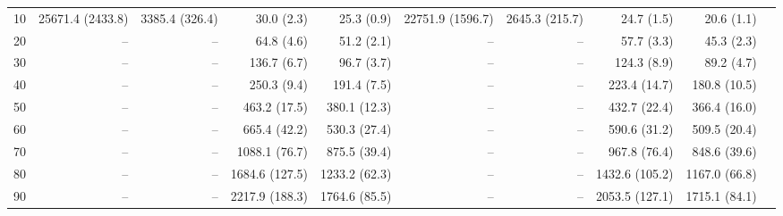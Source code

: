 \documentclass[utf8]{frontiersSCNS} %
\begin{document}
\begin{table*}[htp]
{\begin{tabular}{|r|r|r|r|r|r|r|r|r|r|}
    10 & 25671.4 (2433.8) & 3385.4 (326.4) & 30.0 (2.3)     & 25.3 (0.9)     & 22751.9 (1596.7) & 2645.3 (215.7) & 24.7 (1.5)     & 20.6 (1.1)  \\
    20 & --               & --             & 64.8 (4.6)     & 51.2 (2.1)     &  --              &  --            & 57.7 (3.3)     & 45.3 (2.3)  \\
    30 & --               & --             & 136.7 (6.7)    & 96.7 (3.7)     &  --              &  --            & 124.3 (8.9)    & 89.2 (4.7)  \\
    40 & --               & --             & 250.3 (9.4)    & 191.4 (7.5)    &  --              &  --            & 223.4 (14.7)   & 180.8 (10.5) \\
    50 & --               & --             & 463.2 (17.5)   & 380.1 (12.3)   &  --              &  --            & 432.7 (22.4)   & 366.4 (16.0) \\
    60 & --               & --             & 665.4 (42.2)   & 530.3 (27.4)   &  --              &  --            & 590.6 (31.2)   & 509.5 (20.4) \\
    70 & --               & --             & 1088.1 (76.7)  & 875.5 (39.4)   &  --              &  --            & 967.8 (76.4)   & 848.6 (39.6) \\
    80 & --               & --             & 1684.6 (127.5) & 1233.2 (62.3)  &  --              &  --            & 1432.6 (105.2) & 1167.0 (66.8) \\
    90 & --               & --             & 2217.9 (188.3) & 1764.6 (85.5)  &  --              &  --            & 2053.5 (127.1) & 1715.1 (84.1) \\
                                                                                                                                  

\end{tabular}}
\end{table*}
\end{document}
